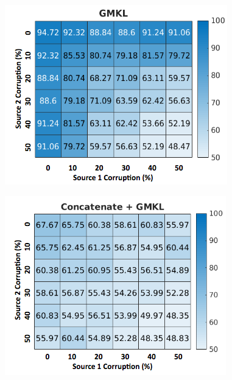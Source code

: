 \documentclass{article}
\begin{document}
\begin{minipage}{\textwidth}
    \begin{minipage}{.5\textwidth}
        \centering
        \includegraphics[width=\textwidth]{dxor_heat_gmkl.png}
        \label{fig:dxor_heat_gmkl}
    \end{minipage}
    \begin{minipage}{.5\textwidth}
        \centering
        \includegraphics[width=\textwidth]{dxor_heat_conc.png}
        \label{fig:dxor_heat_conc}
    \end{minipage}
\end{minipage}
\end{document}
